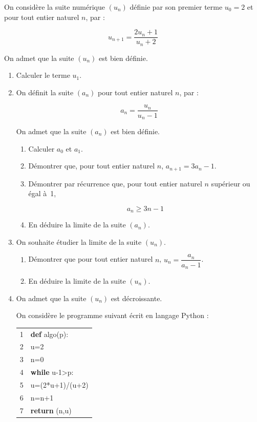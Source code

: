 \medskip

On considère la suite numérique $\left(u_{n}\right)$ définie par son premier terme $u_{0}=2$ et pour tout entier naturel $n$, par :


\[u_{n+1}=\dfrac{2 u_{n}+1}{u_{n}+2}\]

On admet que la suite $\left(u_{n}\right)$ est bien définie.

\begin{enumerate}
\item Calculer le terme $u_{1}$.
\item On définit la suite $\left(a_{n}\right)$ pour tout entier naturel $n$, par :

\[a_{n}=\dfrac{u_{n}}{u_{n}-1}\]

On admet que la suite $\left(a_{n}\right)$ est bien définie.

	\begin{enumerate}
		\item Calculer $a_{0}$ et $a_{1}$.

		\item Démontrer que, pour tout entier naturel $n$, $a_{n+1}=3 a_{n}-1$.

		\item Démontrer par récurrence que, pour tout entier naturel $n$ supérieur ou égal à~1,

\[a_{n} \geqslant 3 n-1\]

		\item En déduire la limite de la suite $\left(a_{n}\right)$.
	\end{enumerate}
\item On souhaite étudier la limite de la suite $\left(u_{n}\right)$.
	\begin{enumerate}
		\item Démontrer que pour tout entier naturel $n$, $u_{n}=\dfrac{a_{n}}{a_{n}-1}$.

		\item En déduire la limite de la suite $\left(u_{n}\right)$.
		\end{enumerate}
\item On admet que la suite $\left(u_{n}\right)$ est décroissante.

On considère le programme suivant écrit en langage Python :

\begin{center}
\begin{ttfamily}
\begin{tabularx}{8cm}{|l @{\quad} X|}\hline
	1& \textbf{def} algo(p):\\
	2& \quad u=2\\
	3& \quad n=0\\
	4& \quad \textbf{while} u-1>p:\\
	5& \quad\quad u=(2*u+1)/(u+2)\\
	6& \quad\quad n=n+1\\
	7& \quad \textbf{return} (n,u)\\ \hline
\end{tabularx}
\end{ttfamily}
\end{center}


\end{enumerate}
